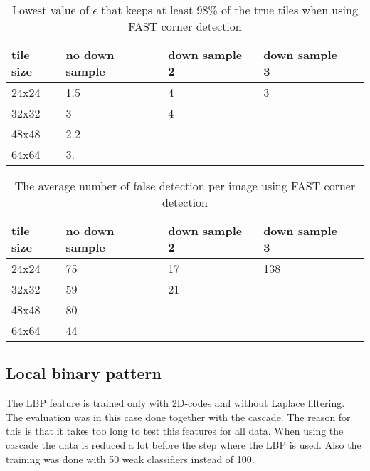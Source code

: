 \begin{table}[H]
\begin{center}
     \begin{tabular}{ | l | l | l | l | l |}
     \hline
     tile size & no down sample & down sample 2 & down sample 3 \\ \hline
   	 24x24 & 1.5 & 4 & 3 		\\ \hline
     32x32 & 3 & 4 & 			\\ \hline
     48x48 & 2.2 &     &  		\\ \hline
     64x64 & 3. &     &			\\ \hline
     \end{tabular}
\end{center}
\caption{Lowest value of $\epsilon$ that keeps at least 98\% of the true tiles when using FAST corner detection}
\end{table}

\begin{table}[H]
\begin{center}
     \begin{tabular}{ | l | l | l | l | l |}
     \hline
     tile size & no down sample & down sample 2 & down sample 3 \\ \hline
   	 24x24 & 75 & 17 & 138		\\ \hline
     32x32 & 59 & 21 & 			\\ \hline
     48x48 & 80    &     &  	\\ \hline
     64x64 & 44     &     &		\\ \hline
     \end{tabular}
\end{center}
\caption{The average number of false detection per image using FAST corner detection}
\end{table}

\subsection{Local binary pattern}
The LBP feature is trained only with 2D-codes and without Laplace filtering. The evaluation was in this case done together with the cascade. The reason for this is that it takes too long to test this features for all data. When using the cascade the data is reduced a lot before the step where the LBP is used. Also the training was done with 50 weak classifiers instead of 100.

